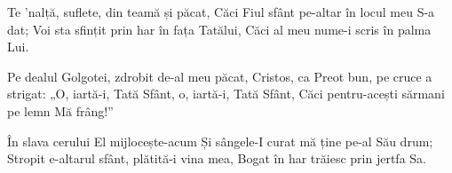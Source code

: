 \beginverse
Te ’nalță, suflete, din teamă și păcat,
Căci Fiul sfânt pe-altar în locul meu S-a dat;
Voi sta sfințit prin har în fața Tatălui,
Căci al meu nume-i scris în palma Lui.
\endverse

\beginverse
Pe dealul Golgotei, zdrobit de-al meu păcat,
Cristos, ca Preot bun, pe cruce a strigat:
„O, iartă-i, Tată Sfânt, o, iartă-i, Tată Sfânt,
Căci pentru-acești sărmani pe lemn Mă frâng!”
\endverse

\beginverse
În slava cerului El mijlocește-acum
Și sângele-I curat mă ține pe-al Său drum;
Stropit e-altarul sfânt, plătită-i vina mea,
Bogat în har trăiesc prin jertfa Sa.
\endverse
\endsong